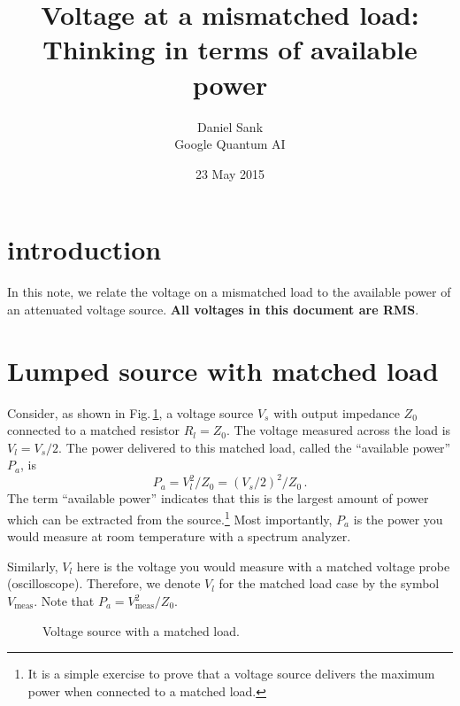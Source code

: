 \documentclass[twocolumn]{article}
\title{Voltage at a mismatched load:\\
Thinking in terms of available power}
\author{Daniel Sank \\
\small Google Quantum AI}
\date{23 May 2015}
\begin{document}
\maketitle

\section{introduction}
In this note, we relate the voltage on a mismatched load to the available power of an attenuated voltage source.
\textbf{All voltages in this document are RMS}.

\section{Lumped source with matched load}

Consider, as shown in Fig.\,\ref{fig:lumped_matched_load}, a voltage source $V_s$ with output impedance $Z_0$ connected to a matched resistor $R_l=Z_0$.
The voltage measured across the load is $V_l = V_s/2$.
The power delivered to this matched load, called the ``available power'' $P_a$, is
\begin{equation}
P_a = V_l^2 / Z_0 = (V_s/2)^2 / Z_0 \, .
\end{equation}
The term ``available power'' indicates that this is the largest amount of power which can be extracted from the source.\footnote{It is a simple exercise to prove that a voltage source delivers the maximum power when connected to a matched load.}
Most importantly, $P_a$ is the power you would measure at room temperature with a spectrum analyzer.

Similarly, $V_l$ here is the voltage you would measure with a matched voltage probe (oscilloscope).
Therefore, we denote $V_l$ for the matched load case by the symbol $V_{\text{meas}}$.
Note that $P_a = V_{\text{meas}}^2 / Z_0$.

\begin{figure}
\begin{centering}
\par\end{centering}
\caption{Voltage source with a matched load.}
\label{fig:lumped_matched_load}
\end{figure}
\end{document}
